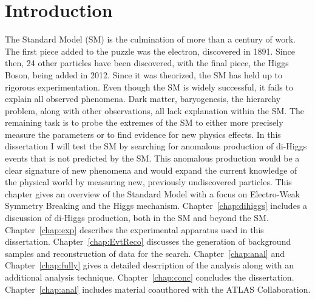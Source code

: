 \chapter{Introduction}
\label{chap:intro}
The Standard Model (SM) is the culmination of more than a century of work. The first piece added to the puzzle was the electron, discovered in 1891. Since then, 24 other particles have been discovered, with the final piece, the Higgs Boson, being added in 2012. Since it was theorized, the SM has held up to rigorous experimentation. Even though the SM is widely successful, it fails to explain all observed phenomena. Dark matter, baryogenesis, the hierarchy problem, along with other observations, all lack explanation within the SM. The remaining task is to probe the extremes of the SM to either more precisely measure the parameters or to find evidence for new physics effects. In this dissertation I will test the SM by searching for anomalous production of di-Higgs events that is not predicted by the SM. This anomalous production would be a clear signature of new phenomena and would expand the current knowledge of the physical world by measuring new, previously undiscovered particles.\newline
\indent This chapter gives an overview of the Standard Model with a focus on Electro-Weak Symmetry Breaking and the Higgs mechanism. Chapter~\ref{chap:dihiggs} includes a discussion of di-Higgs production, both in the SM and beyond the SM. Chapter~\ref{chap:exp} describes the experimental apparatus used in this dissertation. Chapter~\ref{chap:EvtReco} discusses the generation of background samples and reconstruction of data for the search. Chapter~\ref{chap:anal} and Chapter~\ref{chap:fully} gives a detailed description of the analysis along with an additional analysis technique. Chapter~\ref{chap:conc} concludes the dissertation. Chapter~\ref{chap:anal} includes material coauthored with the ATLAS Collaboration.
